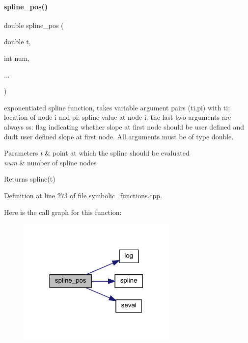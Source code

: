 \paragraph{\texorpdfstring{spline\+\_\+pos()}{spline\_pos()}}
{\footnotesize\ttfamily double spline\+\_\+pos (\begin{DoxyParamCaption}\item[{double}]{t,  }\item[{int}]{num,  }\item[{}]{... }\end{DoxyParamCaption})}

exponentiated spline function, takes variable argument pairs (ti,pi) with {\ttfamily ti}\+: location of node i and {\ttfamily pi}\+: spline value at node i. the last two arguments are always {\ttfamily ss}\+: flag indicating whether slope at first node should be user defined and {\ttfamily dudt} user defined slope at first node. All arguments must be of type double.


\begin{DoxyParams}{Parameters}
{\em t} & point at which the spline should be evaluated \\
\hline
{\em num} & number of spline nodes\\
\hline
\end{DoxyParams}
\begin{DoxyReturn}{Returns}
spline(t) 
\end{DoxyReturn}


Definition at line 273 of file symbolic\+\_\+functions.\+cpp.

Here is the call graph for this function\+:
\nopagebreak
\begin{figure}[H]
\begin{center}
\leavevmode
\includegraphics[width=222pt]{namespaceamici_aa814c7e3b7d45495d0607f3af88027f6_cgraph}
\end{center}
\end{figure}
\mbox{\label{namespaceamici_ad4f5bcfd873d2945ed546194aa80c078}} 
